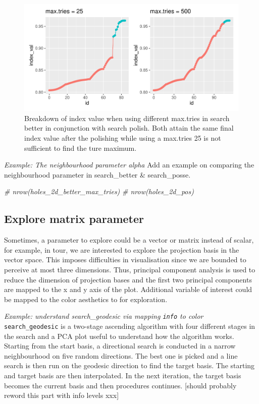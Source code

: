 \documentclass[12pt]{article}
\newenvironment{Shaded}{\begin{snugshade}}{\end{snugshade}}
\newcommand{\CommentTok}[1]{\textcolor[rgb]{0.56,0.35,0.01}{\textit{#1}}}
\begin{document}
\begin{figure}
\centering
\includegraphics{paper_files/figure-latex/polish-1.pdf}
\caption{\label{trace-compare}Breakdown of index value when using
different max.tries in search better in conjunction with search polish.
Both attain the same final index value after the polishing while using a
max.tries 25 is not sufficient to find the ture maximum.}
\end{figure}

\emph{Example: The neighbourhood parameter alpha} Add an example on
comparing the neighbourhood parameter in search\_better \&
search\_posse.

\begin{Shaded}
\begin{Highlighting}[]
\CommentTok{# nrow(holes_2d_better_max_tries)}
\CommentTok{# nrow(holes_2d_pos)}
\end{Highlighting}
\end{Shaded}

\hypertarget{explore-matrix-parameter}{%
\subsection{Explore matrix parameter}\label{explore-matrix-parameter}}

Sometimes, a parameter to explore could be a vector or matrix instead of
scalar, for example, in tour, we are interested to explore the
projection basis in the vector space. This imposes difficulties in
visualisation since we are bounded to perceive at most three dimensions.
Thus, principal component analysis is used to reduce the dimension of
projection bases and the first two principal components are mapped to
the x and y axis of the plot. Additional variable of interest could be
mapped to the color aesthetics to for exploration.

\emph{Example: understand search\_geodesic via mapping \texttt{info} to
color} \texttt{search\_geodesic} is a two-stage ascending algorithm with
four different stages in the search and a PCA plot useful to understand
how the algorithm works. Starting from the start basis, a directional
search is conducted in a narrow neighbourhood on five random directions.
The best one is picked and a line search is then run on the geodesic
direction to find the target basis. The starting and target basis are
then interpolated. In the next iteration, the target basis becomes the
current basis and then procedures continues. {[}should probably reword
this part with info levels xxx{]}
\end{document}
